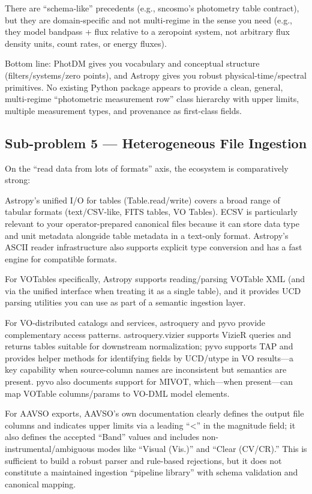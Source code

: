 \documentclass[twocolumn]{aastex701}
\begin{document}
There are “schema-like” precedents (e.g., sncosmo’s photometry table contract), but they are domain-specific and not multi-regime in the sense you need (e.g., they model bandpass + flux relative to a zeropoint system, not arbitrary flux density units, count rates, or energy fluxes). \citep{ref33}

Bottom line: PhotDM gives you vocabulary and conceptual structure (filters/systems/zero points), and Astropy gives you robust physical-time/spectral primitives. No existing Python package appears to provide a clean, general, multi-regime “photometric measurement row” class hierarchy with upper limits, multiple measurement types, and provenance as first-class fields.

\subsection{Sub-problem 5 — Heterogeneous File Ingestion}

On the “read data from lots of formats” axis, the ecosystem is comparatively strong:

Astropy’s unified I/O for tables (Table.read/write) covers a broad range of tabular formats (text/CSV-like, FITS tables, VO Tables). ECSV is particularly relevant to your operator-prepared canonical files because it can store data type and unit metadata alongside table metadata in a text-only format. Astropy’s ASCII reader infrastructure also supports explicit type conversion and has a fast engine for compatible formats. \citep{ref34}

For VOTables specifically, Astropy supports reading/parsing VOTable XML (and via the unified interface when treating it as a single table), and it provides UCD parsing utilities you can use as part of a semantic ingestion layer. \citep{ref35}

For VO-distributed catalogs and services, astroquery and pyvo provide complementary access patterns. astroquery.vizier supports VizieR queries and returns tables suitable for downstream normalization; pyvo supports TAP and provides helper methods for identifying fields by UCD/utype in VO results—a key capability when source-column names are inconsistent but semantics are present. pyvo also documents support for MIVOT, which—when present—can map VOTable columns/params to VO-DML model elements. \citep{ref36}

For AAVSO exports, AAVSO’s own documentation clearly defines the output file columns and indicates upper limits via a leading “<” in the magnitude field; it also defines the accepted “Band” values and includes non-instrumental/ambiguous modes like “Visual (Vis.)” and “Clear (CV/CR).” This is sufficient to build a robust parser and rule-based rejections, but it does not constitute a maintained ingestion “pipeline library” with schema validation and canonical mapping. \citep{ref13}
\end{document}
